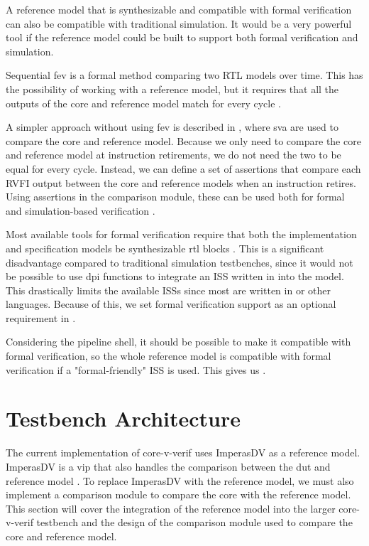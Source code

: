 A reference model that is synthesizable and compatible with formal verification can also be compatible with traditional simulation. It would be a very powerful tool if the reference model could be built to support both formal verification and simulation.

Sequential \acrfull{fev} is a formal method comparing two RTL models over time. This has the possibility of working with a reference model, but it requires that all the outputs of the core and reference model match for every cycle \cite{seligmanFormalVerificationEssential2015}.

A simpler approach without using \acrfull{fev} is described in , where  \acrfull{sva} are used to compare the core and reference model. Because we only need to compare the core and reference model at instruction retirements, we do not need the two to be equal for every cycle. Instead, we can define a set of assertions that compare each RVFI output between the core and reference models when an instruction retires. Using assertions in the comparison module, these can be used both for formal and simulation-based verification \cite{seligmanFormalVerificationEssential2015}.


Most available tools for formal verification require that both the implementation and specification models be synthesizable \acrshort{rtl} blocks \cite{seligmanFormalVerificationEssential2015}. This is a significant disadvantage compared to traditional simulation testbenches, since it would not be possible to use \acrshort{dpi} functions to integrate an ISS written in \cpp into the model. This drastically limits the available ISSs since most are written in \cpp or other languages. Because of this, we set formal verification support as an optional requirement in .

Considering the pipeline shell, it should be possible to make it compatible with formal verification, so the whole reference model is compatible with formal verification if a "formal-friendly" ISS is used. This gives us .


\section{Testbench Architecture}
\label{sec:testbench}


The current implementation of core-v-verif uses ImperasDV as a reference model. ImperasDV is a \acrfull{vip} that also handles the comparison between the \acrshort{dut} and reference model \cite{imperassoftwareltdRISCVProcessorOVP2023}. To replace ImperasDV with the reference model, we must also implement a comparison module to compare the core with the reference model. This section will cover the integration of the reference model into the larger core-v-verif testbench and the design of the comparison module used to compare the core and reference model.

